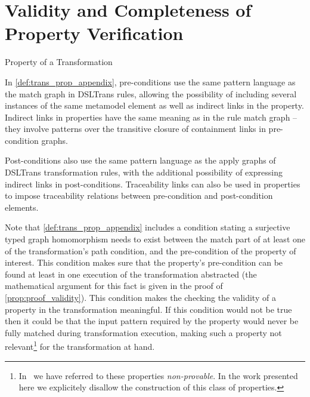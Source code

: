 \section{Validity and Completeness of Property Verification}
\label{sec:val_complete_prop_verif}

\setcounter{proposition}{0}
\setcounter{lemma}{0}
\setcounter{equation}{0}

\onehalfspacing 

\begin{definition}{Property of a Transformation\\}
\label{def:trans_prop_appendix}
\end{definition}

In \cref{def:trans_prop_appendix}, pre-conditions use the same pattern language as the match graph in
DSLTrans rules, allowing the possibility of including several instances of
the same metamodel element as well as indirect links in the property. Indirect links in properties have
the same meaning as in the rule match graph -- they
involve patterns over the transitive closure of containment links in pre-condition graphs.

Post-conditions also use the same pattern language as the
apply graphs of DSLTrans transformation rules, with the additional
possibility of expressing indirect links in post-conditions. Traceability links can
also be used in properties to impose traceability relations between pre-condition
and post-condition elements.

Note that \cref{def:trans_prop_appendix} includes a condition stating a surjective typed graph homomorphism needs to exist between the match part of at least one of the transformation's path condition, and the pre-condition of the property of interest. This condition makes sure that the property's pre-condition can be found at least in one execution of the transformation abstracted (the mathematical argument for this fact is given in the proof of \cref{prop:proof_validity}). This condition makes the checking the validity of a property in the transformation meaningful. If this condition would not be true then it could be that the input pattern required by the property would never be fully matched during transformation execution, making such a property not relevant\footnote{In~\cite{DBLP:conf/sle/BarrocaLAFS10} we have referred to these properties \emph{non-provable}. In the work presented here we explicitely disallow the construction of this class of properties.} for the transformation at hand.


